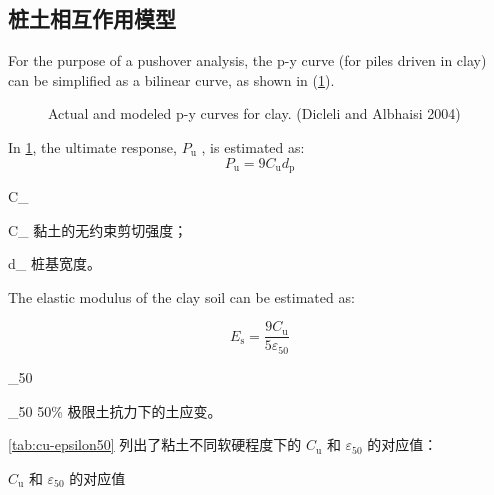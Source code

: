 \subsection{桩土相互作用模型}
For the purpose of a pushover analysis, the p-y curve (for piles driven in clay) can be simplified as a bilinear curve, as shown in (\cref{fig:p-y-curves}).

\begin{figure}
  \caption{Actual and modeled p-y curves for clay. (Dicleli and Albhaisi 2004)}
  \label{fig:p-y-curves}
\end{figure}

In \cref{fig:p-y-curves}, the ultimate response, $P_\text{u}$ , is estimated as:
\begin{equation}
  P_\text{u} =9 C_\text{u} d_\text{p}
\end{equation}
\begin{EqDesc}{C_}
  \item[C_\text{u}] 黏土的无约束剪切强度；
  \item[d_\text{p}] 桩基宽度。
\end{EqDesc}

The elastic modulus of the clay soil can be estimated as:

\begin{equation}
  E_\text{s} = \frac {9 C_\text{u}}{5 \varepsilon_{50}}
\end{equation}
\begin{EqDesc}{\varepsilon_{50}}
  \item[\varepsilon_{50}] 50\% 极限土抗力下的土应变。
\end{EqDesc}

\cref{tab:cu-epsilon50} 列出了粘土不同软硬程度下的 $C_\text{u}$ 和 $\varepsilon_{50}$ 的对应值：

\begin{table}
  \caption{$C_\text{u}$ 和 $\varepsilon_{50}$ 的对应值}
  \label{tab:cu-epsilon50}
  
\end{table}


